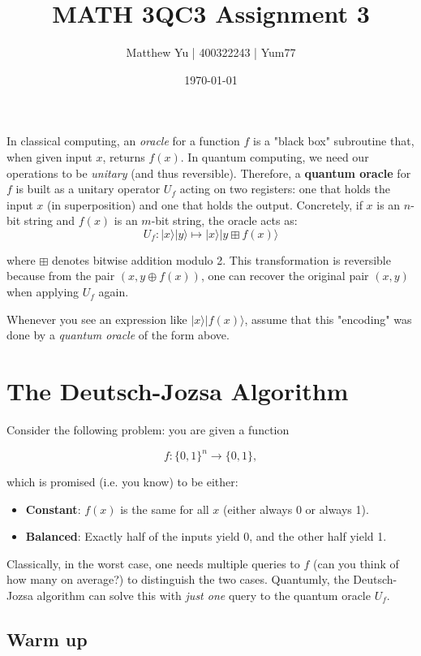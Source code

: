 \documentclass{article}
\begin{document}
\title{MATH 3QC3 Assignment 3}
\author{Matthew Yu | 400322243 | Yum77}
\date{\today}
\maketitle
In classical computing, an \textit{oracle} for a function $f$ is a "black box" subroutine that, when given input $x$, returns $f(x)$. In quantum computing, we need our operations to be \textit{unitary} (and thus reversible). Therefore, a \textbf{quantum oracle} for $f$ is built as a unitary operator $U_{f}$ acting on two registers: one that holds the input $x$ (in superposition) and one that holds the output. Concretely, if $x$ is an $n$-bit string and $f(x)$ is an $m$-bit string, the oracle acts as:
$$U_{f}:|x\rangle|y\rangle \mapsto |x\rangle|y \boxplus f(x)\rangle$$

where $\boxplus$ denotes bitwise addition modulo 2. This transformation is reversible because from the pair $(x,y\oplus f(x))$, one can recover the original pair $(x,y)$ when applying $U_{f}$ again.

Whenever you see an expression like $|x\rangle|f(x)\rangle$, assume that this "encoding" was done by a \textit{quantum oracle} of the form above.

\section{The Deutsch-Jozsa Algorithm}

Consider the following problem: you are given a function

$$f:\{0,1\}^{n} \rightarrow \{0,1\},$$

which is promised (i.e. you know) to be either:

\begin{itemize}
    \item \textbf{Constant}: \(f(x)\) is the same for all \(x\) (either always 0 or always 1).
    \item \textbf{Balanced}: Exactly half of the inputs yield 0, and the other half yield 1.
\end{itemize}

Classically, in the worst case, one needs multiple queries to \(f\) (can you think of how many on average?) to distinguish the two cases. Quantumly, the Deutsch-Jozsa algorithm can solve this with \textit{just one} query to the quantum oracle \(U_{f}\).

\subsection{Warm up}
\end{document}
